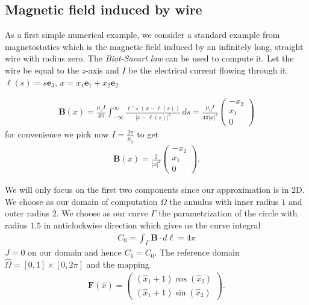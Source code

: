 \documentclass[../master_thesis.tex]{subfiles}
\begin{document}
\subsection{Magnetic field induced by wire}
As a first simple numerical example, we consider a standard example from 
magnetostatics which is the magnetic field induced by an infinitely long, 
straight wire with radius zero. The \textit{Biot-Savart law} can be used to compute it. 
Let the wire be equal to the $z$-axis and $I$ be the electrical current 
flowing through it. $\bm{\ell}(s) = s \mathbf{e}_3$, $x = x_1 \mathbf{e}_1 +  x_2 \mathbf{e}_2$

\begin{align*}
    \mathbf{B}(x) = \frac{\mu_0 I}{4\pi} \int_{-\infty}^\infty  
        \frac{\ell' \times (x - \ell(s))}{|x - \ell(s)|^3} \, ds
    = \frac{\mu_0 I}{4\pi |x|^2}  \begin{pmatrix}-x_2 \\ x_1 \\ 0 \end{pmatrix}
\end{align*}
for convenience we pick now $I = \frac{2 \pi}{\mu_0}$ to get 
\begin{align*}
    \mathbf{B}(x) = \frac{2}{|x|^2} \begin{pmatrix}-x_2 \\ x_1 \\ 0 \end{pmatrix}.
\end{align*}

We will only focus on the first two components since our approximation is in 2D.
We choose as our domain of computation $\Omega$ the annulus with 
inner radius $1$ and outer radius $2$. 
We choose as our curve $\Gamma$ the parametrization of the circle with radius 
$1.5$ in anticlockwise direction which gives us the curve integral 
\begin{align*}
    C_0 = \int_\Gamma \mathbf{B}\cdot d\ell = 4\pi
\end{align*}
$J= 0$ on our domain and hence $C_1 = C_0$. 
The reference domain $\hat{\Omega} = [0,1] \times [0, 2\pi]$ and the mapping 
\begin{align*}
    \mathbf{F}(\hat{x}) = \begin{pmatrix}
            (\hat{x}_1 + 1)\cos(\hat{x}_2 ) 
            \\ (\hat{x}_1 + 1)\sin(\hat{x}_2 ) 
    \end{pmatrix}.
\end{align*}
\end{document}
